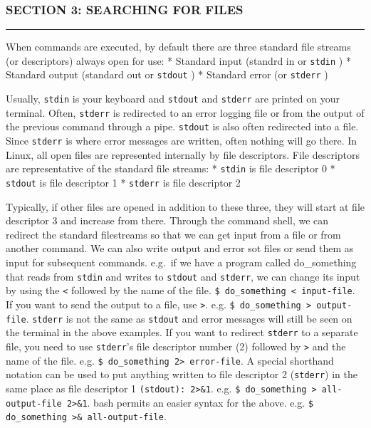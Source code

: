 \subsubsection{SECTION 3: SEARCHING FOR
FILES}\label{section-3-searching-for-files}

\begin{center}\rule{3in}{0.4pt}\end{center}

When commands are executed, by default there are three standard file
streams (or descriptors) always open for use: * Standard input (standrd
in or \texttt{stdin} ) * Standard output (standard out or
\texttt{stdout} ) * Standard error (or \texttt{stderr} )

Usually, \texttt{stdin} is your keyboard and \texttt{stdout} and
\texttt{stderr} are printed on your terminal. Often, \texttt{stderr} is
redirected to an error logging file or from the output of the previous
command through a pipe. \texttt{stdout} is also often redirected into a
file. Since \texttt{stderr} is where error messages are written, often
nothing will go there. In Linux, all open files are represented
internally by file descriptors. File descriptors are representative of
the standard file streams: * \texttt{stdin} is file descriptor 0 *
\texttt{stdout} is file descriptor 1 * \texttt{stderr} is file
descriptor 2

Typically, if other files are opened in addition to these three, they
will start at file descriptor 3 and increase from there. Through the
command shell, we can redirect the standard filestreams so that we can
get input from a file or from another command. We can also write output
and error sot files or send them as input for subsequent commands.
e.g.~if we have a program called do\_something that reads from
\texttt{stdin} and writes to \texttt{stdout} and \texttt{stderr}, we can
change its input by using the \texttt{\textless{}} followed by the name
of the file. \texttt{\$ do\_something \textless{} input-file}. If you
want to send the output to a file, use \texttt{\textgreater{}}. e.g.
\texttt{\$ do\_something \textgreater{} output-file}. \texttt{stderr} is
not the same as \texttt{stdout} and error messages will still be seen on
the terminal in the above examples. If you want to redirect
\texttt{stderr} to a separate file, you need to use \texttt{stderr}'s
file descriptor number (2) followed by \texttt{\textgreater{}} and the
name of the file. e.g.
\texttt{\$ do\_something 2\textgreater{} error-file}. A special
shorthand notation can be used to put anything written to file
descriptor 2 (\texttt{stderr}) in the same place as file descriptor 1
\texttt{(stdout): 2\textgreater{}\&1}. e.g.
\texttt{\$ do\_something \textgreater{} all-output-file 2\textgreater{}\&1}.
bash permits an easier syntax for the above. e.g.
\texttt{\$ do\_something \textgreater{}\& all-output-file}.

